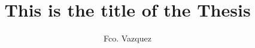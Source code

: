 \documentclass{tufte-book}
\title{This is the title of the Thesis}
\author{Fco. Vazquez}
\begin{document}
\justifying   



\normalsize
\maketitle
\tableofcontents




\citep{*}
\end{document}
